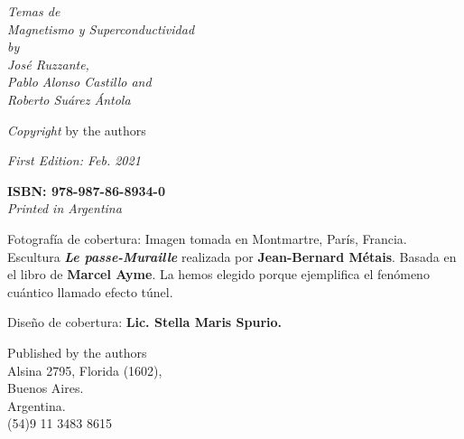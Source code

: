 \documentclass[
11pt, %
spanish,
singlespacing, %
parskip, %
headsepline, %
]{MastersDoctoralThesis} %
\begin{document}






\newpage
\begin{flushleft}
\begin{small}

\vspace{10.0cm} 

\vfill

\textit{Temas de \\ Magnetismo y Superconductividad \\
by \\
José Ruzzante, \\ %
Pablo Alonso Castillo and \\ %
Roberto Suárez Ántola}
\vspace{5mm} 

\textit{Copyright}  by the authors

\textit{First Edition: Feb. 2021}
\vspace{5mm} 

\textbf{ISBN: 978-987-86-8934-0} \\
\textit{Printed in Argentina}
\vspace{5mm} 

Fotografía de cobertura: Imagen tomada en Montmartre, París, Francia. Escultura \textbf{\textit{Le passe-Muraille}} realizada por \textbf{Jean-Bernard Métais}. Basada en el libro de \textbf{Marcel Ayme}. La hemos elegido porque  ejemplifica el fenómeno cuántico llamado efecto túnel.           

Diseño de cobertura: \textbf{Lic. Stella Maris Spurio.} 




Published by the authors\\ 
Alsina 2795, Florida (1602),\\
Buenos Aires.\\
Argentina.\\
(54)9 11 3483 8615
\vspace{5mm} 


\end{small}
\end{flushleft}
\end{document}
